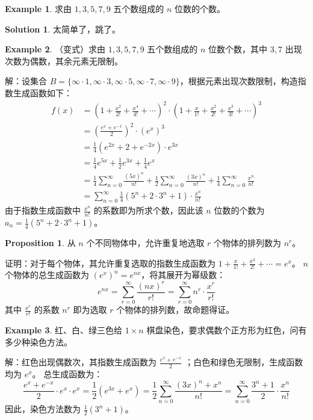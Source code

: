 \documentclass[oneside]{book}
\theoremstyle{definition}
\newtheorem{example}{Example}[section]
\newtheorem{proposition}{Proposition}[section]
\newtheorem*{sol}{Solution}
\begin{document}
\begin{example}
	求由 \( 1,3,5,7,9 \) 五个数组成的 \( n \) 位数的个数。
\end{example}
\begin{sol}
	太简单了，跳了。
\end{sol}
\begin{example}
	（变式）求由 \( 1,3,5,7,9 \) 五个数组成的 \( n \) 位数个数，其中 \( 3,7 \) 出现次数为偶数，其余元素无限制。
	
	解：设集合 \( B = \{ \infty \cdot 1, \infty \cdot 3, \infty \cdot 5, \infty \cdot 7, \infty \cdot 9 \} \)，根据元素出现次数限制，构造指数生成函数如下：
	\[
	\begin{aligned}
		f(x) &= \left(1 + \frac{x^2}{2!} + \frac{x^4}{4!} + \cdots\right)^2 \cdot \left(1 + \frac{x}{1!} + \frac{x^2}{2!} + \frac{x^3}{3!} + \cdots\right)^3 \\
		&= \left( \frac{e^x + e^{-x}}{2} \right)^2 \cdot (e^x)^3 \\
		&= \frac{1}{4}(e^{2x} + 2 + e^{-2x}) \cdot e^{3x} \\
		&= \frac{1}{4}e^{5x} + \frac{1}{2}e^{3x} + \frac{1}{4}e^{x} \\
		&= \frac{1}{4}\sum_{n=0}^{\infty} \frac{(5x)^n}{n!} + \frac{1}{2}\sum_{n=0}^{\infty} \frac{(3x)^n}{n!} + \frac{1}{4}\sum_{n=0}^{\infty} \frac{x^n}{n!} \\
		&= \sum_{n=0}^{\infty} \frac{1}{4}\left(5^n + 2 \cdot 3^n + 1\right) \cdot \frac{x^n}{n!}
	\end{aligned}
	\]
	由于指数生成函数中 \( \frac{x^n}{n!} \) 的系数即为所求个数，因此该 \( n \) 位数的个数为 \( a_n = \frac{1}{4}\left(5^n + 2 \cdot 3^n + 1\right) \)。
\end{example}
\begin{proposition}
	从 \( n \) 个不同物体中，允许重复地选取 \( r \) 个物体的排列数为 \( n^r \)。
	
	证明：对于每个物体，其允许重复选取的指数生成函数为 \( 1 + \frac{x}{1!} + \frac{x^2}{2!} + \cdots = e^x \)。
	\( n \) 个物体的总生成函数为 \( (e^x)^n = e^{nx} \)，将其展开为幂级数：
	\[
	e^{nx} = \sum_{r=0}^{\infty} \frac{(nx)^r}{r!} = \sum_{r=0}^{\infty} n^r \cdot \frac{x^r}{r!}
	\]
	其中 \( \frac{x^r}{r!} \) 的系数 \( n^r \) 即为选取 \( r \) 个物体的排列数，故命题得证。
\end{proposition}

\begin{example}
	红、白、绿三色给 \( 1 \times n \) 棋盘染色，要求偶数个正方形为红色，问有多少种染色方法。
	
	解：红色出现偶数次，其指数生成函数为 \( \frac{e^x + e^{-x}}{2} \) ；白色和绿色无限制，生成函数均为 \( e^x \)。
	总生成函数为：
	\[
	\frac{e^x + e^{-x}}{2} \cdot e^x \cdot e^x = \frac{1}{2}(e^{3x} + e^x) = \frac{1}{2}\sum_{n=0}^{\infty} \frac{(3x)^n + x^n}{n!} = \sum_{n=0}^{\infty} \frac{3^n + 1}{2} \cdot \frac{x^n}{n!}
	\]
	因此，染色方法数为 \( \frac{1}{2}(3^n + 1) \)。
\end{example}
\end{document}

